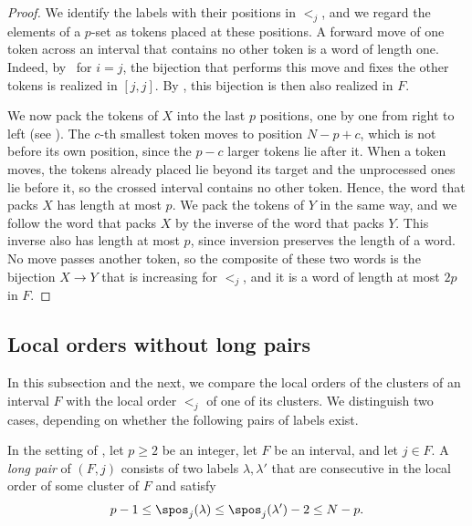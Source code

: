 \documentclass[fontsize=12pt,leading=14pt]{fullpaper}
\begin{document}
\begin{proof}
  We identify the labels with their positions in $<_j$, and we regard the elements of a $p$-set as tokens placed at these positions.
  A forward move of one token across an interval that contains no other token is a word of length one.
  Indeed, by~ for $i=j$, the bijection that performs this move and fixes the other tokens is realized in $[j,j]$.
  By , this bijection is then also realized in $F$.

  We now pack the tokens of $X$ into the last $p$ positions, one by one from right to left (see ).
  The $c$-th smallest token moves to position $N-p+c$, which is not before its own position, since the $p-c$ larger tokens lie after it.
  When a token moves, the tokens already placed lie beyond its target and the unprocessed ones lie before it, so the crossed interval contains no other token.
  Hence, the word that packs $X$ has length at most $p$.
  We pack the tokens of $Y$ in the same way, and we follow the word that packs $X$ by the inverse of the word that packs $Y$.
  This inverse also has length at most $p$, since inversion preserves the length of a word.
  No move passes another token, so the composite of these two words is the bijection $X\to Y$ that is increasing for $<_j$, and it is a word of length at most $2p$ in $F$.
\end{proof}

\subsection{Local orders without long pairs}\label{sec:s3-proper}

In this subsection and the next, we compare the local orders of the clusters of an interval $F$ with the local order $<_j$ of one of its clusters.
We distinguish two cases, depending on whether the following pairs of labels exist.

\begin{definition}\label{def:s3-long-pair}
  In the setting of , let $p\ge2$ be an integer, let $F$ be an interval, and let $j\in F$.
  A \emph{long pair} of $(F,j)$ consists of two labels $\lambda,\lambda'$ that are consecutive in the local order of some cluster of $F$ and satisfy
  \[
    p-1\le\spos_j(\lambda)\le\spos_j(\lambda')-2\le N-p.
  \]
\end{definition}
\end{document}

